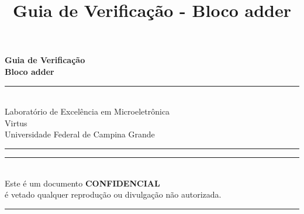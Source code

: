 \documentclass[a4paper]{article}
\begin{document}
\begin{titlepage}
{{                \textbf{Guia de Verificação \\
                Bloco adder}
                
                \vspace{0.7cm} %
            }
        }
    
    \vfill %
    
    
    \parbox[t]{0.93\textwidth}{ %
    
        \raggedleft %
        \hfill\rule{0.2\linewidth}{1pt} \\[4pt]%
        \large %
        {\Large Laboratório de Excelência em Microeletrônica}\\[4pt] %
        Virtus\\
        Universidade Federal de Campina Grande\\[4pt] %

        \hfill\rule{0.2\linewidth}{1pt}%
    }
    
\end{titlepage}

\title{Guia de Verificação - Bloco adder}


    
\pagebreak
\hspace{0pt}
\vfill
\begin{center}
\hfill\rule{\linewidth}{1pt} \\[4pt]
    Este é um documento \textbf{CONFIDENCIAL} \\
    é vetado qualquer reprodução ou divulgação não autorizada.\\[4pt]
    \hfill\rule{\linewidth}{1pt} \\[4pt]
\end{center}
\vfill
\hspace{0pt}
\pagebreak

\end{document}

